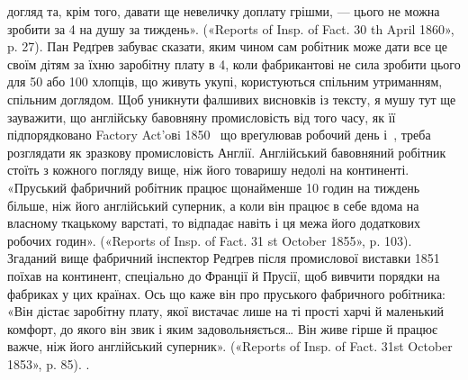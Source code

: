 {догляд та, крім того, давати ще невеличку доплату грішми, — цього
не можна зробити за 4 на душу за тиждень». («Reports of Insp.
of Fact. 30 th April 1860», p. 27). Пан Редґрев забуває сказати, яким
чином сам робітник може дати все це своїм дітям за їхню заробітну плату
в 4, коли фабрикантові не сила зробити цього для 50 або 100
хлопців, що живуть укупі, користуються спільним утриманням, спільним
доглядом. Щоб уникнути фалшивих висновків із тексту, я мушу тут ще
зауважити, що англійську бавовняну промисловість від того часу, як
її підпорядковано Factory Act’oвi 1850~ що вреґулював робочий день
і~, треба розглядати як зразкову промисловість Англії. Англійський
бавовняний робітник стоїть з кожного погляду вище, ніж його товаришу
недолі на континенті. «Пруський фабричний робітник працює щонайменше
10 годин на тиждень більше, ніж його англійський суперник, а коли він
працює в себе вдома на власному ткацькому варстаті, то відпадає навіть
і ця межа його додаткових робочих годин». («Reports of Insp. of Fact.
31 st October 1855», p. 103). Згаданий вище фабричний інспектор Редґрев
після промислової виставки 1851~ поїхав на континент, спеціально до
Франції й Прусії, щоб вивчити порядки на фабриках у цих країнах.
Ось що каже він про пруського фабричного робітника: «Він дістає заробітну
плату, якої вистачає лише на ті прості харчі й маленький комфорт, до
якого він звик і яким задовольняється\dots{} Він живе гірше й працює важче,
ніж його англійський суперник». («Reports of Insp. of Fact. 31st October
1853», p. 85).
}.

